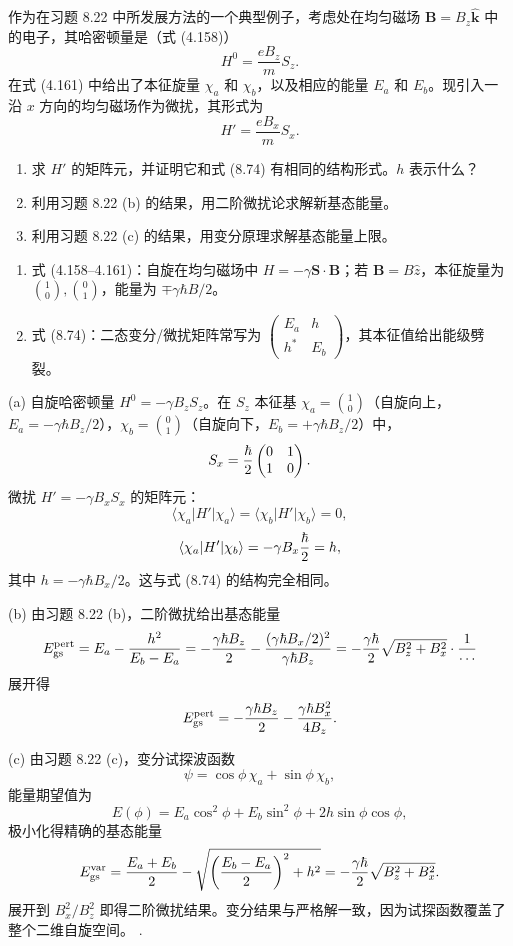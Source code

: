 \begin{question}
作为在习题 8.22 中所发展方法的一个典型例子，考虑处在均匀磁场 $\mathbf B=B_z\hat{\mathbf k}$ 中的电子，其哈密顿量是（式 (4.158)）
\[
H^0=\frac{eB_z}{m}S_z.
\]
在式 (4.161) 中给出了本征旋量 $\chi_a$ 和 $\chi_b$，以及相应的能量 $E_a$ 和 $E_b$。现引入一沿 $x$ 方向的均匀磁场作为微扰，其形式为
\[
H'=\frac{eB_x}{m}S_x.
\]
\begin{enumerate}
\item 求 $H'$ 的矩阵元，并证明它和式 (8.74) 有相同的结构形式。$h$ 表示什么？
\item 利用习题 8.22 (b) 的结果，用二阶微扰论求解新基态能量。
\item 利用习题 8.22 (c) 的结果，用变分原理求解基态能量上限。
\end{enumerate}

\par\smallskip
{}
\begin{enumerate}[leftmargin=2.2em,itemsep=0.12em,topsep=0.12em,parsep=0pt]
\item 式 (4.158--4.161)：自旋在均匀磁场中 $H=-\gamma\mathbf S\cdot\mathbf B$；若 $\mathbf B=B\hat z$，本征旋量为 $\binom10,\binom01$，能量为 $\mp\gamma\hbar B/2$。
\item 式 (8.74)：二态变分/微扰矩阵常写为 $\begin{pmatrix}E_a&h\\h^*&E_b\end{pmatrix}$，其本征值给出能级劈裂。
\end{enumerate}

\end{question}
\begin{solution}
(a) 自旋哈密顿量 $H^0=-\gamma B_zS_z$。在 $S_z$ 本征基 $\chi_a=\binom10$（自旋向上，$E_a=-\gamma\hbar B_z/2$），$\chi_b=\binom01$（自旋向下，$E_b=+\gamma\hbar B_z/2$）中，
\[
S_x={\hbar\over2}\begin{pmatrix}0&1\\1&0\end{pmatrix}.
\]
微扰 $H'=-\gamma B_xS_x$ 的矩阵元：
\[
\langle\chi_a|H'|\chi_a\rangle=\langle\chi_b|H'|\chi_b\rangle=0,
\]
\[
\langle\chi_a|H'|\chi_b\rangle=-\gamma B_x{\hbar\over2}=h,
\]
其中 $h=-\gamma\hbar B_x/2$。这与式 (8.74) 的结构完全相同。

(b) 由习题 8.22 (b)，二阶微扰给出基态能量
\[
E_{\rm gs}^{\rm pert}=E_a-{h^2\over E_b-E_a}
=-{\gamma\hbar B_z\over2}-{(\gamma\hbar B_x/2)^2\over\gamma\hbar B_z}
=-{\gamma\hbar\over2}\sqrt{B_z^2+B_x^2}\cdot{1\over\cdots}
\]
展开得
\[
E_{\rm gs}^{\rm pert}=-{\gamma\hbar B_z\over2}-{\gamma\hbar B_x^2\over4B_z}.
\]

(c) 由习题 8.22 (c)，变分试探波函数
\[
\psi=\cos\phi\,\chi_a+\sin\phi\,\chi_b,
\]
能量期望值为
\[
E(\phi)=E_a\cos^2\phi+E_b\sin^2\phi+2h\sin\phi\cos\phi,
\]
极小化得精确的基态能量
\[
E_{\rm gs}^{\rm var}={E_a+E_b\over2}-\sqrt{\left({E_b-E_a\over2}\right)^2+h^2}
=-{\gamma\hbar\over2}\sqrt{B_z^2+B_x^2}.
\]
展开到 $B_x^2/B_z^2$ 即得二阶微扰结果。变分结果与严格解一致，因为试探函数覆盖了整个二维自旋空间。
.
\end{solution}

